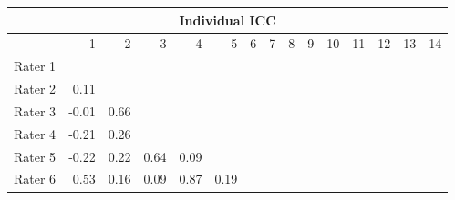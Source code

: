 \begin{tabular}{l|rrrrrrrrrrrrrl}
\toprule
\multicolumn{15}{c}{Individual ICC} \\
\midrule
      & 1     & 2     & 3     & 4     & 5     & 6     & 7     & 8     & 9     & 10    & 11    & 12    & 13    & \multicolumn{1}{r}{14} \\
\midrule
\midrule
Rater 1 & \multicolumn{1}{l}{} & \multicolumn{1}{l}{} & \multicolumn{1}{l}{} & \multicolumn{1}{l}{} & \multicolumn{1}{l}{} & \multicolumn{1}{l}{} & \multicolumn{1}{l}{} & \multicolumn{1}{l}{} & \multicolumn{1}{l}{} & \multicolumn{1}{l}{} & \multicolumn{1}{l}{} & \multicolumn{1}{l}{} & \multicolumn{1}{l}{} &  \\
Rater 2 & \cellcolor[rgb]{ .984,  .933,  .945}0.11 & \multicolumn{1}{l}{} & \multicolumn{1}{l}{} & \multicolumn{1}{l}{} & \multicolumn{1}{l}{} & \multicolumn{1}{l}{} & \multicolumn{1}{l}{} & \multicolumn{1}{l}{} & \multicolumn{1}{l}{} & \multicolumn{1}{l}{} & \multicolumn{1}{l}{} & \multicolumn{1}{l}{} & \multicolumn{1}{l}{} &  \\
Rater 3 & \cellcolor[rgb]{ .98,  .824,  .835}-0.01 & \cellcolor[rgb]{ .545,  .678,  .847}0.66 & \multicolumn{1}{l}{} & \multicolumn{1}{l}{} & \multicolumn{1}{l}{} & \multicolumn{1}{l}{} & \multicolumn{1}{l}{} & \multicolumn{1}{l}{} & \multicolumn{1}{l}{} & \multicolumn{1}{l}{} & \multicolumn{1}{l}{} & \multicolumn{1}{l}{} & \multicolumn{1}{l}{} &  \\
Rater 4 & \cellcolor[rgb]{ .976,  .643,  .655}-0.21 & \cellcolor[rgb]{ .91,  .933,  .973}0.26 & \multicolumn{1}{l}{} & \multicolumn{1}{l}{} & \multicolumn{1}{l}{} & \multicolumn{1}{l}{} & \multicolumn{1}{l}{} & \multicolumn{1}{l}{} & \multicolumn{1}{l}{} & \multicolumn{1}{l}{} & \multicolumn{1}{l}{} & \multicolumn{1}{l}{} & \multicolumn{1}{l}{} &  \\
Rater 5 & \cellcolor[rgb]{ .976,  .635,  .643}-0.22 & \cellcolor[rgb]{ .945,  .957,  .984}0.22 & \cellcolor[rgb]{ .565,  .69,  .851}0.64 & \cellcolor[rgb]{ .984,  .914,  .925}0.09 & \multicolumn{1}{l}{} & \multicolumn{1}{l}{} & \multicolumn{1}{l}{} & \multicolumn{1}{l}{} & \multicolumn{1}{l}{} & \multicolumn{1}{l}{} & \multicolumn{1}{l}{} & \multicolumn{1}{l}{} & \multicolumn{1}{l}{} &  \\
Rater 6 & \cellcolor[rgb]{ .663,  .761,  .886}0.53 & \cellcolor[rgb]{ .984,  .976,  .988}0.16 & \cellcolor[rgb]{ .984,  .914,  .925}0.09 & \cellcolor[rgb]{ .353,  .541,  .776}0.87 & \cellcolor[rgb]{ .973,  .976,  .996}0.19 & \multicolumn{1}{l}{} & \multicolumn{1}{l}{} & \multicolumn{1}{l}{} & \multicolumn{1}{l}{} & \multicolumn{1}{l}{} & \multicolumn{1}{l}{} & \multicolumn{1}{l}{} & \multicolumn{1}{l}{} &  \\

\end{tabular}
